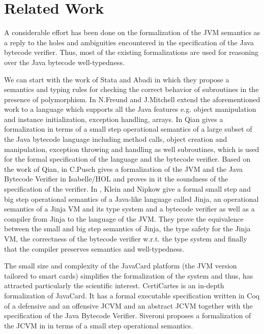 \section{Related Work}\label{relWork}
 A considerable effort has been done on the formalization of 
 the JVM semantics as a reply to the holes and ambiguities encountered in
 the specification of the Java bytecode verifier. 
 Thus,  most of the existing formalizations are
 used for reasoning over the Java bytecode well-typedness.
 
 We can start with the work of Stata and Abadi \cite{stata98type} in which they propose a semantics  and 
  typing rules for checking the correct behavior of  subroutines in the presence of polymorphism.
 In \cite{FM99FFJ}  N.Freund and J.Mitchell extend the aforementioned work to 
 a language which supports all the Java features e.g.
 object manipulation and instance initialization, exception handling, arrays.
 In \cite{qian99formal}  Qian  gives a formalization in terms of a small step operational semantics of a
 large subset of the Java bytecode language including method calls, object creation and manipulation,
 exception throwing and handling as well subroutines, which is used for the formal specification of the language and the bytecode verifier.
 Based on the work of Qian, in \cite{pusch98proving} C.Pusch gives a formalization of the JVM and the Java Bytecode Verifier
 in Isabelle/HOL and proves in it the soundness of the specification of the verifier.
 In \cite{KleinN04}, Klein and Nipkow give a formal small step and big step operational
 semantics of a Java-like language called Jinja, an operational semantics of a Jinja VM and its type system and a bytecode verifier as well as 
 a compiler from Jinja to the language of the JVM. They prove the equivalence between the small and big step
 semantics of Jinja, the  type safety for the Jinja VM, the correctness of the bytecode verifier w.r.t. the type system
 and finally that the compiler preserves semantics and well-typedness.
  

  The small size and complexity of the JavaCard platform (the JVM version tailored to smart cards) 
 simplifies the formalization of the system and thus,
 has attracted  particularly the scientific interest. CertiCartes \cite{barthe01formal,barthe02formal}
 is an in-depth formalization of JavaCard. It has a formal executable
 specification written in Coq of a defensive and an offensive JCVM and an abstract JCVM together with the specification
 of the Java Bytecode Verifier.  Siveroni proposes a formalization of the JCVM in \cite{siveroni04operational} in terms of
 a small step operational semantics. 


